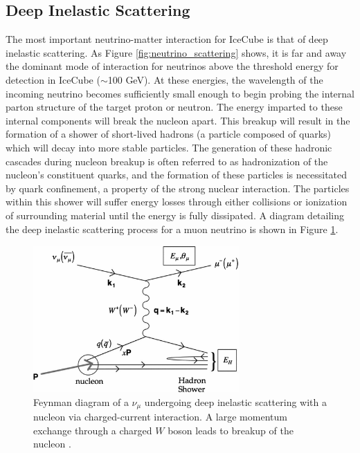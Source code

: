 \documentclass{gatech-thesis}
\begin{document}
\subsection{Deep Inelastic Scattering}
The most important neutrino-matter interaction for IceCube is that of deep inelastic scattering. As Figure \ref{fig:neutrino_scattering} shows, it is far and away the dominant mode of interaction for neutrinos above the threshold energy for detection in IceCube ($\sim$100 GeV). At these energies, the wavelength of the incoming neutrino becomes sufficiently small enough to begin probing the internal parton structure of the target proton or neutron. The energy imparted to these internal components will break the nucleon apart. This breakup will result in the formation of a shower of short-lived hadrons (a particle composed of quarks) which will decay into more stable particles. The generation of these hadronic cascades during nucleon breakup is often referred to as hadronization of the nucleon's constituent quarks, and the formation of these particles is necessitated by quark confinement, a property of the strong nuclear interaction. The particles within this shower will suffer energy losses through either collisions or ionization of surrounding material until the energy is fully dissipated. A diagram detailing the deep inelastic scattering process for a muon neutrino is shown in Figure \ref{fig:dis_scattering}.

\begin{figure}[ht]
  \begin{center}
    \includegraphics[width=0.7\textwidth,keepaspectratio]{dis.png}
  \end{center}
  \caption{Feynman diagram of a $\nu_{\mu}$ undergoing deep inelastic scattering with a nucleon via charged-current interaction. A large momentum exchange through a charged $W$ boson leads to breakup of the nucleon \cite{2012RvMP...84.1307F}.}
  \label{fig:dis_scattering}
\end{figure}
\end{document}
